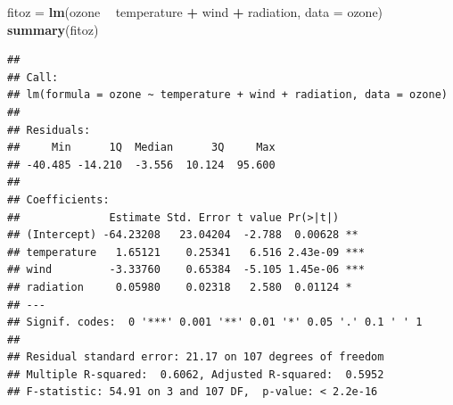 \documentclass[10pt,ignorenonframetext,]{beamer}
\newenvironment{Shaded}{\begin{snugshade}}{\end{snugshade}}
\newcommand{\KeywordTok}[1]{\textcolor[rgb]{0.13,0.29,0.53}{\textbf{#1}}}
\newcommand{\DataTypeTok}[1]{\textcolor[rgb]{0.13,0.29,0.53}{#1}}
\newcommand{\StringTok}[1]{\textcolor[rgb]{0.31,0.60,0.02}{#1}}
\newcommand{\OperatorTok}[1]{\textcolor[rgb]{0.81,0.36,0.00}{\textbf{#1}}}
\newcommand{\NormalTok}[1]{#1}
\begin{document}
\begin{frame}[fragile]

\footnotesize

\begin{Shaded}
\begin{Highlighting}[]
\NormalTok{fitoz =}\StringTok{ }\KeywordTok{lm}\NormalTok{(ozone }\OperatorTok{~}\StringTok{ }\NormalTok{temperature }\OperatorTok{+}\StringTok{ }\NormalTok{wind }\OperatorTok{+}\StringTok{ }\NormalTok{radiation, }\DataTypeTok{data =}\NormalTok{ ozone)}
\KeywordTok{summary}\NormalTok{(fitoz)}
\end{Highlighting}
\end{Shaded}

\begin{verbatim}
## 
## Call:
## lm(formula = ozone ~ temperature + wind + radiation, data = ozone)
## 
## Residuals:
##     Min      1Q  Median      3Q     Max 
## -40.485 -14.210  -3.556  10.124  95.600 
## 
## Coefficients:
##              Estimate Std. Error t value Pr(>|t|)    
## (Intercept) -64.23208   23.04204  -2.788  0.00628 ** 
## temperature   1.65121    0.25341   6.516 2.43e-09 ***
## wind         -3.33760    0.65384  -5.105 1.45e-06 ***
## radiation     0.05980    0.02318   2.580  0.01124 *  
## ---
## Signif. codes:  0 '***' 0.001 '**' 0.01 '*' 0.05 '.' 0.1 ' ' 1
## 
## Residual standard error: 21.17 on 107 degrees of freedom
## Multiple R-squared:  0.6062, Adjusted R-squared:  0.5952 
## F-statistic: 54.91 on 3 and 107 DF,  p-value: < 2.2e-16
\end{verbatim}

\normalsize

\end{frame}
\end{document}
